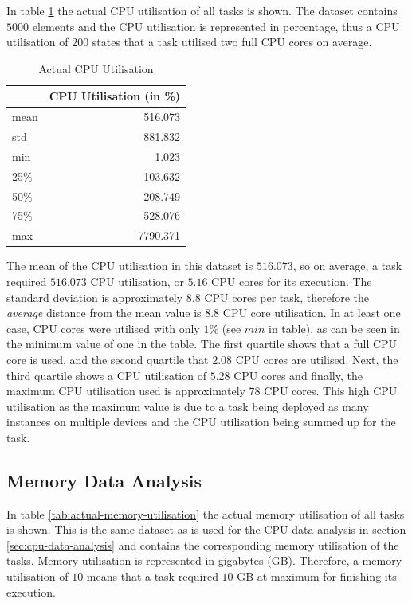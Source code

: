     In table \ref{tab:actual-cpu-utilisation} the actual CPU utilisation of all tasks is shown.
    The dataset contains $5000$ elements and the CPU utilisation is represented in percentage, 
    thus a CPU utilisation of $200$ states that a task utilised two full CPU cores on average.
    \begin{table}
      \centering
      \caption{Actual CPU Utilisation}
      \label{tab:actual-cpu-utilisation}
      \begin{tabular}{|l|r|}
        \toprule
        {} &  CPU Utilisation (in \%) \\
        \midrule
        mean  &    516.073 \\
        std   &    881.832 \\
        min   &      1.023 \\
        25\%   &    103.632 \\
        50\%   &    208.749 \\
        75\%   &    528.076 \\
        max   &   7790.371 \\
        \bottomrule
      \end{tabular}
    \end{table}
    The mean of the CPU utilisation in this dataset is $516.073$, 
    so on average, a task required $516.073$ CPU utilisation, or $5.16$ CPU cores for its execution.
    The standard deviation is approximately $8.8$ CPU cores per task, therefore the \emph{average} distance from the mean value is $8.8$ CPU core utilisation.
    In at least one case, CPU cores were utilised with only $1 \%$ (see $min$ in table), as can be seen in the minimum value of one in the table.
    The first quartile shows that a full CPU core is used, and the second quartile that $2.08$ CPU cores are utilised.
    Next, the third quartile shows a CPU utilisation of $5.28$ CPU cores and finally, the maximum CPU utilisation used is approximately $78$ CPU cores. This high CPU utilisation as the maximum value is due to a task being deployed as many instances on multiple devices and the CPU utilisation being summed up for the task.
  

  \subsection{Memory Data Analysis}
  \label{sec:memory-data-analysis}

    In table \ref{tab:actual-memory-utilisation} the actual memory utilisation of all tasks is shown.
    This is the same dataset as is used for the CPU data analysis in section \ref{sec:cpu-data-analysis} and contains the corresponding memory utilisation of the tasks. Memory utilisation is represented in gigabytes (GB). 
    Therefore, a memory utilisation of $10$ means that a task required $10$ GB at maximum for finishing its execution.

